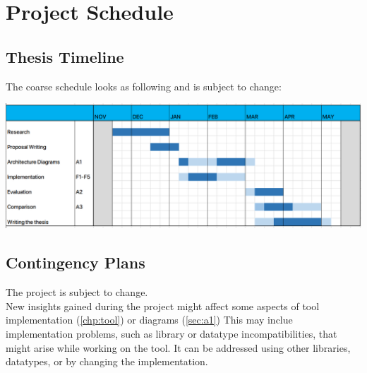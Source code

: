 \chapter{Project Schedule}
\label{chp:schedule}

\section{Thesis Timeline}
\label{sec:gantt}

The coarse schedule looks as following and is subject to change:

\includegraphics[width=\textwidth]{Graphics/time.PNG}

\section{Contingency Plans}
\label{sec:contingency}

The project is subject to change.\\
New insights gained during the project might affect some aspects of tool implementation (\ref{chp:tool}) or diagrams (\ref{sec:a1})
This may inclue implementation problems, such as library or datatype incompatibilities, that might arise while working on the tool. 
It can be addressed using other libraries, datatypes, or by changing the implementation. 